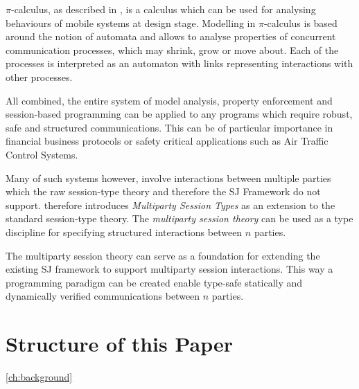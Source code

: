 $\pi$-calculus, as described in \cite{pi-calculus}, is a calculus which can be used for analysing behaviours of mobile systems at design stage. Modelling in $\pi$-calculus is based around the notion of automata and allows to analyse properties of concurrent communication processes, which may shrink, grow or move about. Each of the processes is interpreted as an automaton with links representing interactions with other processes.

All combined, the entire system of model analysis, property enforcement and session-based programming can be applied to any programs which require robust, safe and structured communications. This can be of particular importance in financial business protocols or safety critical applications such as Air Traffic Control Systems.

Many of such systems however, involve interactions between multiple parties which the raw session-type theory and therefore the SJ Framework do not support. \cite{multiparty_sess_types} therefore introduces \textit{Multiparty Session Types} as an extension to the standard session-type theory. The \textit{multiparty session theory} can be used as a type discipline for specifying structured interactions between $n$ parties.

The multiparty session theory can serve as a foundation for extending the existing SJ framework to support multiparty session interactions. This way a programming paradigm can be created enable type-safe statically and dynamically verified communications between $n$ parties. 

\section{Structure of this Paper}

\autoref{ch:background}


